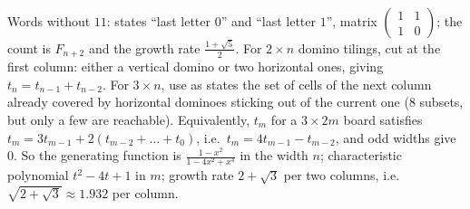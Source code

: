 \documentclass[11pt,a4paper]{article}
\begin{document}
Words without \(11\): states ``last letter \(0\)'' and ``last letter \(1\)'', matrix \(\begin{pmatrix}1&1\\1&0\end{pmatrix}\); the count is \(F_{n+2}\) and the growth rate \(\frac{1+\sqrt5}2\). For \(2\times n\) domino tilings, cut at the first column: either a vertical domino or two horizontal ones, giving \(t_n=t_{n-1}+t_{n-2}\).
For \(3\times n\), use as states the set of cells of the next column already covered by horizontal dominoes sticking out of the current one (8 subsets, but only a few are reachable). Equivalently, \(t_m\) for a \(3\times2m\) board satisfies \(t_m=3t_{m-1}+2(t_{m-2}+\dots+t_0)\), i.e.~\(t_m=4t_{m-1}-t_{m-2}\), and odd widths give \(0\).
So the generating function is \(\frac{1-x^2}{1-4x^2+x^4}\) in the width \(n\); characteristic polynomial \(t^2-4t+1\) in \(m\); growth rate \(2+\sqrt3\) per two columns, i.e.~\(\sqrt{2+\sqrt3}\approx1.932\) per column.
\end{document}
